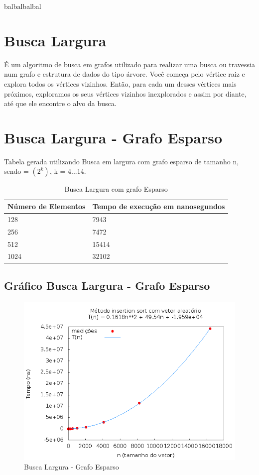 \documentclass[12pt,a4paper,twoside]{report}
\begin{document}
balbalbalbal

\section{Busca Largura}

É um algoritmo de busca em grafos utilizado para realizar uma busca ou travessia num grafo e estrutura de dados do tipo árvore. Você começa pelo vértice raiz e explora todos os vértices vizinhos. Então, para cada um desses vértices mais próximos, exploramos os seus vértices vizinhos inexplorados e assim por diante, até que ele encontre o alvo da busca.

\section{Busca Largura - Grafo Esparso}
Tabela gerada utilizando Busca em largura com grafo esparso de tamanho n, sendo = $(2^k)$, k = 4...14.
\begin{table}[H]
\centering
\caption{Busca Largura com grafo Esparso}
\begin{tabular}{|l|l|}
\hline
\multicolumn{1}{|c|}{\textbf{Número de Elementos}} & \multicolumn{1}{c|}{\textbf{Tempo de execução em nanosegundos}} \\ \hline
128 & 7943 \\ \hline
256 & 7472 \\ \hline
512 & 15414 \\ \hline
1024 & 32102 \\ \hline
\end{tabular}
\end{table}

\subsection{Gráfico Busca Largura - Grafo Esparso}
\begin{figure}[H]
    \centering
    \includegraphics[width=0.7\linewidth]{graficos/Insertion/vIntAleatorio/vIntAleatorio.png}
  \caption{Busca Largura - Grafo Esparso}
\end{figure}
\end{document}
